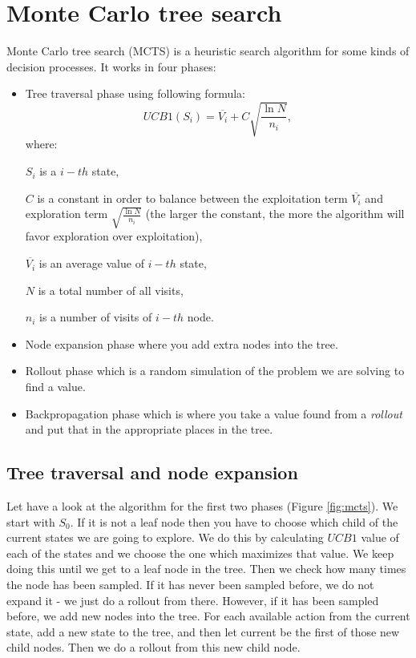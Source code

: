 \documentclass[12pt]{article}
\begin{document}
\section{Monte Carlo tree search}
Monte Carlo tree search (MCTS) is a heuristic search algorithm for some kinds of decision processes. It works in four phases:
\begin{itemize}
\item Tree traversal phase using following formula:
\[
    UCB1(S_i) = \overline{V_i} + C \sqrt{\frac{\ln{N}}{n_i}} ,
\]
where:

$S_i$ is a $i-th$ state,

$C$ is a constant in order to balance between the exploitation term $\overline{V_i}$ and exploration term $\sqrt{\frac{\ln{N}}{n_i}}$ (the larger the constant, the more the algorithm will favor exploration over exploitation),

$\overline{V_i}$ is an average value of $i-th$ state,

$N$ is a total number of all visits,

$n_i$ is a number of visits of $i-th$ node.

\item Node expansion phase where you add extra nodes into the tree.
\item Rollout phase which is a random simulation of the problem we are solving to find a value.
\item Backpropagation phase which is where you take a value found from a \textit{rollout} and put that in the appropriate places in the tree.
\end{itemize}

\subsection{Tree traversal and node expansion}

Let have a look at the algorithm for the first two phases (Figure \ref{fig:mcts}).
We start with $S_0$. If it is not a leaf node then you have to choose which child of the current states we are going to explore. We do this by calculating $UCB1$ value of each of the states and we choose the one which maximizes that value. We keep doing this until we get to a leaf node in the tree. Then we check how many times the node has been sampled. If it has never been sampled before, we do not expand it - we just do a rollout from there. However, if it has been sampled before, we add new nodes into the tree. For each available action from the current state, add a new state to the tree, and then let current be the first of those new child nodes. Then we do a rollout from this new child node.
\end{document}
